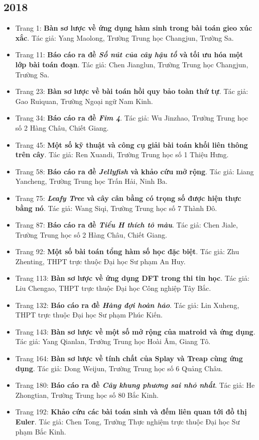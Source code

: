 \documentclass[11pt]{article}
\begin{document}
\subsection{2018}
\begin{itemize}[leftmargin=2em]
  \item Trang 1: \textbf{Bàn sơ lược về ứng dụng hàm sinh trong bài toán gieo xúc xắc}. Tác giả: Yang Maolong, Trường Trung học Changjun, Trường Sa.
  \item Trang 11: \textbf{Báo cáo ra đề \emph{Số nút của cây hậu tố} và tối ưu hóa một lớp bài toán đoạn}. Tác giả: Chen Jianglun, Trường Trung học Changjun, Trường Sa.
  \item Trang 23: \textbf{Bàn sơ lược về bài toán hồi quy bảo toàn thứ tự}. Tác giả: Gao Ruiquan, Trường Ngoại ngữ Nam Kinh.
  \item Trang 34: \textbf{Báo cáo ra đề \emph{Fim 4}}. Tác giả: Wu Jinzhao, Trường Trung học số 2 Hàng Châu, Chiết Giang.
  \item Trang 45: \textbf{Một số kỹ thuật và công cụ giải bài toán khối liên thông trên cây}. Tác giả: Ren Xuandi, Trường Trung học số 1 Thiệu Hưng.
  \item Trang 58: \textbf{Báo cáo ra đề \emph{Jellyfish} và khảo cứu mở rộng}. Tác giả: Liang Yancheng, Trường Trung học Trấn Hải, Ninh Ba.
  \item Trang 75: \textbf{\emph{Leafy Tree} và cây cân bằng có trọng số được hiện thực bằng nó}. Tác giả: Wang Siqi, Trường Trung học số 7 Thành Đô.
  \item Trang 87: \textbf{Báo cáo ra đề \emph{Tiểu H thích tô màu}}. Tác giả: Chen Jiale, Trường Trung học số 2 Hàng Châu, Chiết Giang.
  \item Trang 92: \textbf{Một số bài toán tổng hàm số học đặc biệt}. Tác giả: Zhu Zhenting, THPT trực thuộc Đại học Sư phạm An Huy.
  \item Trang 113: \textbf{Bàn sơ lược về ứng dụng DFT trong thi tin học}. Tác giả: Liu Chengao, THPT trực thuộc Đại học Công nghiệp Tây Bắc.
  \item Trang 132: \textbf{Báo cáo ra đề \emph{Hàng đợi hoàn hảo}}. Tác giả: Lin Xuheng, THPT trực thuộc Đại học Sư phạm Phúc Kiến.
  \item Trang 143: \textbf{Bàn sơ lược về một số mở rộng của matroid và ứng dụng}. Tác giả: Yang Qianlan, Trường Trung học Hoài Âm, Giang Tô.
  \item Trang 164: \textbf{Bàn sơ lược về tính chất của Splay và Treap cùng ứng dụng}. Tác giả: Dong Weijun, Trường Trung học số 6 Quảng Châu.
  \item Trang 180: \textbf{Báo cáo ra đề \emph{Cây khung phương sai nhỏ nhất}}. Tác giả: He Zhongtian, Trường Trung học số 80 Bắc Kinh.
  \item Trang 192: \textbf{Khảo cứu các bài toán sinh và đếm liên quan tới đồ thị Euler}. Tác giả: Chen Tong, Trường Thực nghiệm trực thuộc Đại học Sư phạm Bắc Kinh.
\end{itemize}
\end{document}
